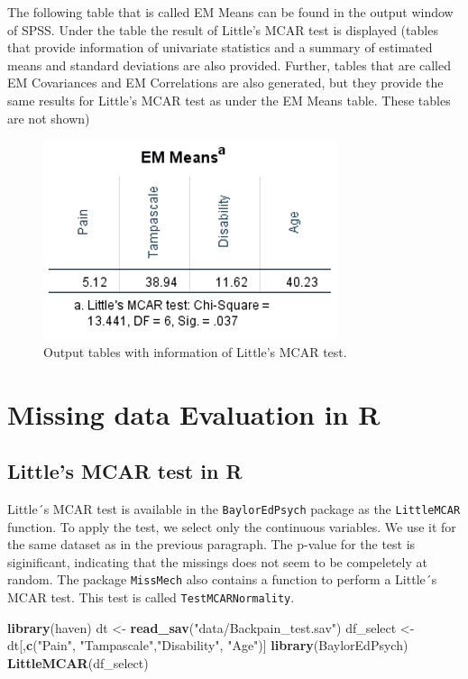 \documentclass[
]{book}
\newenvironment{Shaded}{\begin{snugshade}}{\end{snugshade}}
\newcommand{\KeywordTok}[1]{\textcolor[rgb]{0.13,0.29,0.53}{\textbf{#1}}}
\newcommand{\NormalTok}[1]{#1}
\newcommand{\StringTok}[1]{\textcolor[rgb]{0.31,0.60,0.02}{#1}}
\begin{document}
The following table that is called EM Means can be found in the output window of SPSS. Under the table the result of Little's MCAR test is displayed (tables that provide information of univariate statistics and a summary of estimated means and standard deviations are also provided. Further, tables that are called EM Covariances and EM Correlations are also generated, but they provide the same results for Little's MCAR test as under the EM Means table. These tables are not shown)

\begin{figure}

{\centering \includegraphics[width=0.5\linewidth]{images/fig2.14} 

}

\caption{Output tables with information of Little’s MCAR test.}\label{fig:tab2-7}
\end{figure}

\hypertarget{missing-data-evaluation-in-r}{%
\section{Missing data Evaluation in R}\label{missing-data-evaluation-in-r}}

\hypertarget{littles-mcar-test-in-r}{%
\subsection{Little's MCAR test in R}\label{littles-mcar-test-in-r}}

Little´s MCAR test is available in the \texttt{BaylorEdPsych} package as the \texttt{LittleMCAR} function. To apply the test, we select only the continuous variables. We use it for the same dataset as in the previous paragraph. The p-value for the test is siginificant, indicating that the missings does not seem to be compeletely at random. The package \texttt{MissMech} also contains a function to perform a Little´s MCAR test. This test is called \texttt{TestMCARNormality}.

\begin{Shaded}
\begin{Highlighting}[]
\KeywordTok{library}\NormalTok{(haven)}
\NormalTok{dt <-}\StringTok{ }\KeywordTok{read_sav}\NormalTok{(}\StringTok{"data/Backpain_test.sav"}\NormalTok{)}
\NormalTok{df_select <-}\StringTok{ }\NormalTok{dt[,}\KeywordTok{c}\NormalTok{(}\StringTok{"Pain"}\NormalTok{, }\StringTok{"Tampascale"}\NormalTok{,}\StringTok{"Disability"}\NormalTok{, }\StringTok{"Age"}\NormalTok{)]}
\KeywordTok{library}\NormalTok{(BaylorEdPsych)}
\KeywordTok{LittleMCAR}\NormalTok{(df_select)}
\end{Highlighting}
\end{Shaded}
\end{document}
